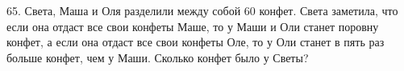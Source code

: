 65. Света, Маша и Оля разделили между собой 60 конфет. Света заметила, что если она отдаст все свои конфеты Маше, то у Маши и Оли станет поровну конфет, а если она отдаст все свои конфеты Оле, то у Оли станет в пять раз больше конфет, чем у Маши. Сколько конфет было у Светы?\\
